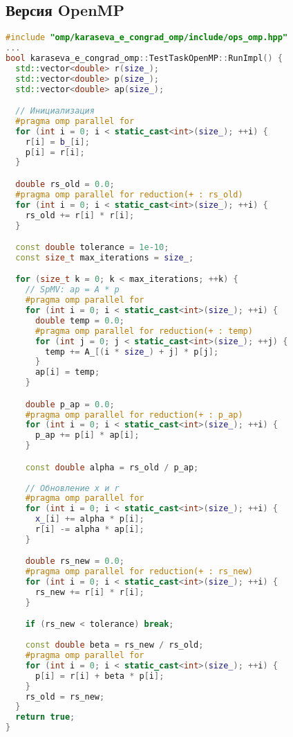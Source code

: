 \documentclass[12pt]{article}
\begin{document}
\subsection{Версия OpenMP}
\begin{lstlisting}[language=C++]
#include "omp/karaseva_e_congrad_omp/include/ops_omp.hpp"
...
bool karaseva_e_congrad_omp::TestTaskOpenMP::RunImpl() {
  std::vector<double> r(size_);
  std::vector<double> p(size_);
  std::vector<double> ap(size_);

  // Инициализация
  #pragma omp parallel for
  for (int i = 0; i < static_cast<int>(size_); ++i) {
    r[i] = b_[i];
    p[i] = r[i];
  }

  double rs_old = 0.0;
  #pragma omp parallel for reduction(+ : rs_old)
  for (int i = 0; i < static_cast<int>(size_); ++i) {
    rs_old += r[i] * r[i];
  }

  const double tolerance = 1e-10;
  const size_t max_iterations = size_;

  for (size_t k = 0; k < max_iterations; ++k) {
    // SpMV: ap = A * p
    #pragma omp parallel for
    for (int i = 0; i < static_cast<int>(size_); ++i) {
      double temp = 0.0;
      #pragma omp parallel for reduction(+ : temp)
      for (int j = 0; j < static_cast<int>(size_); ++j) {
        temp += A_[(i * size_) + j] * p[j];
      }
      ap[i] = temp;
    }

    double p_ap = 0.0;
    #pragma omp parallel for reduction(+ : p_ap)
    for (int i = 0; i < static_cast<int>(size_); ++i) {
      p_ap += p[i] * ap[i];
    }

    const double alpha = rs_old / p_ap;
    
    // Обновление x и r
    #pragma omp parallel for
    for (int i = 0; i < static_cast<int>(size_); ++i) {
      x_[i] += alpha * p[i];
      r[i] -= alpha * ap[i];
    }

    double rs_new = 0.0;
    #pragma omp parallel for reduction(+ : rs_new)
    for (int i = 0; i < static_cast<int>(size_); ++i) {
      rs_new += r[i] * r[i];
    }

    if (rs_new < tolerance) break;
    
    const double beta = rs_new / rs_old;
    #pragma omp parallel for
    for (int i = 0; i < static_cast<int>(size_); ++i) {
      p[i] = r[i] + beta * p[i];
    }
    rs_old = rs_new;
  }
  return true;
}
\end{lstlisting}
\end{document}
